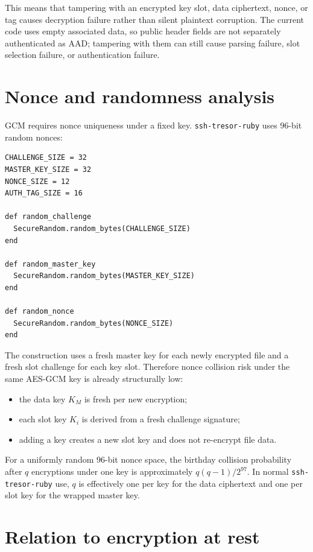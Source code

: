 \documentclass[11pt]{article}
\theoremstyle{definition}
\theoremstyle{plain}
\newcommand{\Project}{\texttt{ssh-tresor-ruby}}
\begin{document}
This means that tampering with an encrypted key slot, data ciphertext, nonce, or tag causes decryption failure rather than silent plaintext corruption. The current code uses empty associated data, so public header fields are not separately authenticated as AAD; tampering with them can still cause parsing failure, slot selection failure, or authentication failure.

\section{Nonce and randomness analysis}

GCM requires nonce uniqueness under a fixed key. \Project{} uses 96-bit random nonces:

\begin{lstlisting}[style=rubycode,caption={Random sizes from lib/ssh\_tresor/crypto.rb.}]
CHALLENGE_SIZE = 32
MASTER_KEY_SIZE = 32
NONCE_SIZE = 12
AUTH_TAG_SIZE = 16

def random_challenge
  SecureRandom.random_bytes(CHALLENGE_SIZE)
end

def random_master_key
  SecureRandom.random_bytes(MASTER_KEY_SIZE)
end

def random_nonce
  SecureRandom.random_bytes(NONCE_SIZE)
end
\end{lstlisting}

The construction uses a fresh master key for each newly encrypted file and a fresh slot challenge for each key slot. Therefore nonce collision risk under the same AES-GCM key is already structurally low:

\begin{itemize}[leftmargin=*]
  \item the data key $K_M$ is fresh per new encryption;
  \item each slot key $K_i$ is derived from a fresh challenge signature;
  \item adding a key creates a new slot key and does not re-encrypt file data.
\end{itemize}

For a uniformly random 96-bit nonce space, the birthday collision probability after $q$ encryptions under one key is approximately $q(q-1)/2^{97}$. In normal \Project{} use, $q$ is effectively one per key for the data ciphertext and one per slot key for the wrapped master key.

\section{Relation to encryption at rest}
\end{document}

